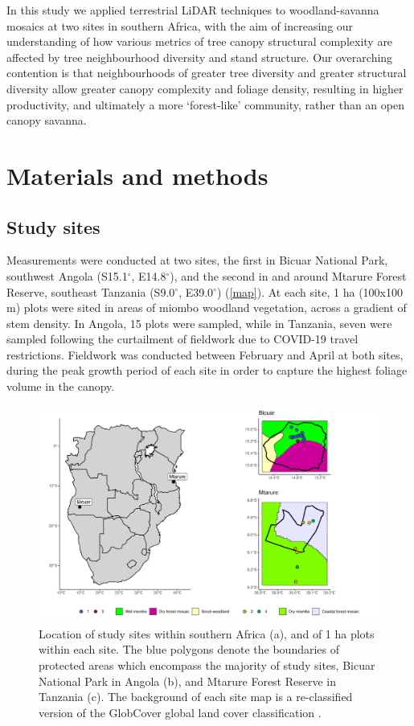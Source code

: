 \documentclass[11pt,a4paper]{article}
\begin{document}
In this study we applied terrestrial LiDAR techniques to woodland-savanna mosaics at two sites in southern Africa, with the aim of increasing our understanding of how various metrics of tree canopy structural complexity are affected by tree neighbourhood diversity and stand structure. Our overarching contention is that neighbourhoods of greater tree diversity and greater structural diversity allow greater canopy complexity and foliage density, resulting in higher productivity, and ultimately a more `forest-like' community, rather than an open canopy savanna.

\section{Materials and methods}

\subsection{Study sites}

Measurements were conducted at two sites, the first in Bicuar National Park, southwest Angola (S15.1$^\circ$, E14.8$^\circ$), and the second in and around Mtarure Forest Reserve, southeast Tanzania (S9.0$^\circ$, E39.0$^\circ$) (\autoref{map}). At each site, 1 ha (100x100 m) plots were sited in areas of miombo woodland vegetation, across a gradient of stem density. In Angola, 15 plots were sampled, while in Tanzania, seven were sampled following the curtailment of fieldwork due to COVID-19 travel restrictions. Fieldwork was conducted between February and April at both sites, during the peak growth period of each site in order to capture the highest foliage volume in the canopy.

\begin{figure}[H]
\centering
	\includegraphics[width=\textwidth]{map}
	\caption{Location of study sites within southern Africa (a), and of 1 ha plots within each site. The blue polygons denote the boundaries of protected areas which encompass the majority of study sites, Bicuar National Park in Angola (b), and Mtarure Forest Reserve in Tanzania (c). The background of each site map is a re-classified version of the GlobCover global land cover classification \citep{Globcover}.}
	\label{map}
\end{figure}
\end{document}
